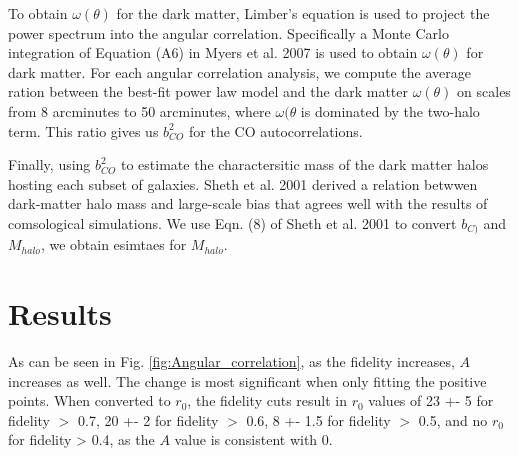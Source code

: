 To obtain $\omega(\theta)$ for the dark matter, Limber's equation is used to project the power spectrum into the angular correlation. Specifically a Monte Carlo integration of Equation (A6) in Myers et al. 2007 is used to obtain $\omega(\theta)$ for dark matter. For each angular correlation analysis, we compute the average ration between the best-fit power law model and the dark matter $\omega(\theta)$ on scales from 8 arcminutes to 50 arcminutes, where $\omega(\theta$ is dominated by the two-halo term. This ratio gives us $b^2_{CO}$ for the CO autocorrelations. 

Finally, using $b^2_{CO}$ to estimate the charactersitic mass of the dark matter halos hosting each subset of galaxies. Sheth et al. 2001 derived a relation betwwen dark-matter halo mass and large-scale bias that agrees well with the results of comsological simulations. We use Eqn. (8) of Sheth et al. 2001 to convert $b_{C)}$ and $M_{halo}$, we obtain esimtaes for $M_{halo}$. 

\section{Results}

As can be seen in Fig. \ref{fig:Angular_correlation}, as the fidelity increases, $A$ increases as well. The change is most significant when only fitting the positive points.  When converted to $r_0$, the fidelity cuts result in $r_0$ values of 23 +- 5 for fidelity $>$ 0.7, 20 +- 2 for fidelity $>$ 0.6, 8 +- 1.5 for fidelity $>$ 0.5, and no $r_0$ for fidelity > 0.4, as the $A$ value is consistent with 0. 

